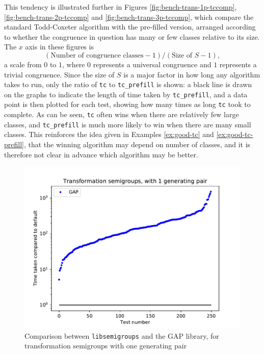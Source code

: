 This tendency is illustrated further in Figures \ref{fig:bench-trans-1p-tccomp},
\ref{fig:bench-trans-2p-tccomp} and \ref{fig:bench-trans-3p-tccomp}, which
compare the standard Todd-Coxeter algorithm with the pre-filled version, arranged
according to whether the congruence in question has many or few classes relative
to its size.  The $x$ axis in these figures is
$$(\text{Number of congruence classes} - 1) / (\text{Size of~} S - 1),$$
a scale from $0$ to $1$, where $0$ represents a universal congruence and $1$
represents a trivial congruence.  Since the size of $S$ is a major factor in how
long any algorithm takes to run, only the ratio of \texttt{tc} to
\texttt{tc\_prefill} is shown: a black line is drawn on the graphs to indicate
the length of time taken by \texttt{tc\_prefill}, and a data point is then
plotted for each test, showing how many times as long \texttt{tc} took to
complete.  As can be seen, \texttt{tc} often wins when there are relatively few
large classes, and \texttt{tc\_prefill} is much more likely to win when there are
many small classes.  This reinforces the idea given in Examples \ref{ex:good-tc}
and \ref{ex:good-tc-prefill}, that the winning algorithm may depend on number of
classes, and it is therefore not clear in advance which algorithm may be better.

\begin{figure}[h]
  \centering
  \includegraphics[width=\textwidth]{pics/ch-pairs/bench-trans-1p-gap}
  \caption{Comparison between \texttt{libsemigroups} and the GAP library, for
    transformation semigroups with one generating pair}
  \label{fig:bench-trans-1p-gap}
\end{figure}

